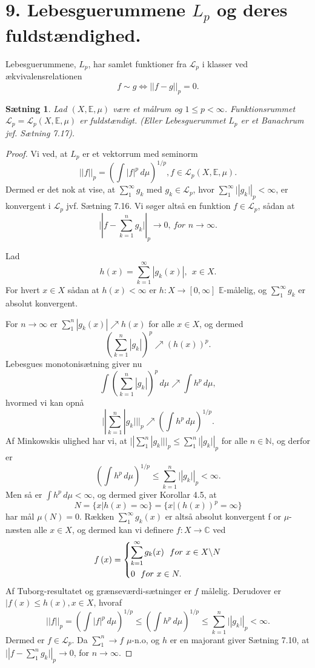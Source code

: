 \documentclass[12pt]{report}
\newtheorem{theorem}[lemma]{Sætning}
\theoremstyle{break}
\newtheorem*{proof}{Bevis}
\theoremstyle{break}
\newcommand{\Int}[1]{\int#1\,d\mu}
\newcommand{\EE}{\mathbb{E}}
\renewcommand{\L}{\mathcal{L}}
\newcommand{\laengde}[1]{\lvert|#1\rvert|}
\newcommand{\1}{\mathds{1}}
\begin{document}
\section*{9. Lebesguerummene $L_p$ og deres fuldstændighed.}
Lebesguerummene, $L_p$, har samlet funktioner fra $\L_p$ i klasser ved ækvivalensrelationen \[f\sim g\Leftrightarrow\laengde{f-g}_p=0.\]
\begin{theorem}
Lad $(X,\EE,\mu)$ være et målrum og $1\leq p<\infty$. Funktionsrummet $\L_p=\L_p(X,\EE,\mu)$ er fuldstændigt. (Eller Lebesguerummet $L_p$ er et Banachrum jvf. Sætning 7.17).
\end{theorem}
\begin{proof}
Vi ved, at $L_p$ er et vektorrum med seminorm \[\laengde{f}_p=\left(\Int{|f|^p}\right)^{1/p}, f\in\L_p(X,\EE,\mu).\] Dermed er det nok at vise, at  $\sum_1^\infty g_k$ med $g_k\in\L_p$, hvor $\sum_1^\infty \laengde{g_k}_p < \infty$, er konvergent i $\L_p$ jvf. Sætning 7.16. Vi søger altså en funktion $f\in\L_p$, sådan at \[\laengde{f-\sum\limits_{k=1}^ng_k}_p\to 0,\, for\,\,n\to\infty.\]

\bigskip

Lad \[h(x)=\sum\limits_{k=1}^\infty|g_k(x)|,~~x\in X.\]
For hvert $x\in X$ sådan at $h(x)<\infty$ er $h\colon X\to[0,\infty]$ $\EE$-målelig, og $\sum_1^\infty g_k$ er absolut konvergent.

\bigskip

For $n\to\infty$ er $\sum_1^n|g_k(x)|\nearrow h(x)$ for alle $x\in X$, og dermed
\[\left(\sum\limits_{k=1}^n|g_k|\right)^p\nearrow (h(x))^p.\]
Lebesgues monotonisætning giver nu
\[\Int{\left(\sum\limits_{k=1}^n|g_k|\right)^p}\nearrow\Int{h^p},\]
hvormed vi kan opnå
\[\laengde{\sum\limits_{k=1}^n|g_k|}_p\nearrow\left(\Int{h^p}\right)^{1/p}.\]
Af Minkowskis ulighed har vi, at $\laengde{\sum_1^n|g_k|}_p\leq\sum_1^n\laengde{g_k}_p$ for alle $n\in\mathbb{N}$, og derfor er
\[\left(\Int{h^p}\right)^{1/p}\leq \sum\limits_{k=1}^n\laengde{g_k}_p<\infty.\]
Men så er $\Int{h^p}<\infty$, og dermed giver Korollar 4.5, at 
\[N=\{x\vert h(x)=\infty\}=\{x\vert (h(x))^p=\infty\}\]
har mål $\mu(N)=0$. Rækken $\sum_1^\infty g_k(x)$ er altså absolut konvergent f or $\mu$-næsten alle $x\in X$, og dermed kan vi definere $f\colon X\to\mathbb{C}$ ved
\[f\left( x \right) = \left\{ \begin{gathered}
  \sum_{k=1}^\infty g_k(x) \hfill ~~for\,\, x\in X\backslash N \\
  0~~for\,\, x\in N. \hfill \\ 
\end{gathered}  \right.\]
Af Tuborg-resultatet og grænseværdi-sætninger er $f$ målelig. Derudover er $|f(x)\leq h(x), x\in X$, hvoraf
\[\laengde{f}_p=\left(\Int{|f|^p}\right)^{1/p}\leq\left(\Int{h^p}\right)^{1/p}\leq\sum\limits_{k=1}^n\laengde{g_k}_p<\infty.\]
Dermed er $f\in\L_p$. Da $\sum_1^n\to f$ $\mu$-n.o, og $h$ er en majorant giver Sætning 7.10, at $\laengde{f-\sum_1^n g_k}_p\to 0$, for $n\to\infty$.
\end{proof}
\end{document}
